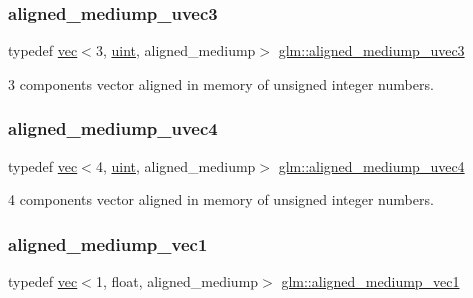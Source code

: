 \subsubsection{\texorpdfstring{aligned\+\_\+mediump\+\_\+uvec3}{aligned\_mediump\_uvec3}}
{\footnotesize\ttfamily typedef \mbox{\hyperlink{structglm_1_1vec}{vec}}$<$3, \mbox{\hyperlink{group__core__precision_ga4fd29415871152bfb5abd588334147c8}{uint}}, aligned\+\_\+mediump$>$ \mbox{\hyperlink{group__gtc__type__aligned_ga5d37a008051d20c6079933f0680b6521}{glm\+::aligned\+\_\+mediump\+\_\+uvec3}}}



3 components vector aligned in memory of unsigned integer numbers. 

\mbox{\label{group__gtc__type__aligned_gace9017071502bcfcd099532706881836}} 
\subsubsection{\texorpdfstring{aligned\+\_\+mediump\+\_\+uvec4}{aligned\_mediump\_uvec4}}
{\footnotesize\ttfamily typedef \mbox{\hyperlink{structglm_1_1vec}{vec}}$<$4, \mbox{\hyperlink{group__core__precision_ga4fd29415871152bfb5abd588334147c8}{uint}}, aligned\+\_\+mediump$>$ \mbox{\hyperlink{group__gtc__type__aligned_gace9017071502bcfcd099532706881836}{glm\+::aligned\+\_\+mediump\+\_\+uvec4}}}



4 components vector aligned in memory of unsigned integer numbers. 

\mbox{\label{group__gtc__type__aligned_ga8751a96bb361e9f007e5555eb90e3230}} 
\subsubsection{\texorpdfstring{aligned\+\_\+mediump\+\_\+vec1}{aligned\_mediump\_vec1}}
{\footnotesize\ttfamily typedef \mbox{\hyperlink{structglm_1_1vec}{vec}}$<$1, float, aligned\+\_\+mediump$>$ \mbox{\hyperlink{group__gtc__type__aligned_ga8751a96bb361e9f007e5555eb90e3230}{glm\+::aligned\+\_\+mediump\+\_\+vec1}}}



